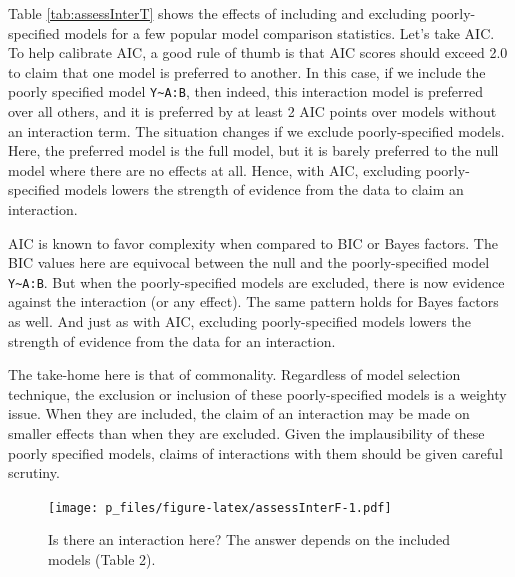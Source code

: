 \documentclass[
  english,
  ,man]{apa6}
\begin{document}
Table \ref{tab:assessInterT} shows the effects of including and excluding poorly-specified models for a few popular model comparison statistics. Let's take AIC. To help calibrate AIC, a good rule of thumb is that AIC scores should exceed 2.0 to claim that one model is preferred to another. In this case, if we include the poorly specified model \texttt{Y\textasciitilde{}A:B}, then indeed, this interaction model is preferred over all others, and it is preferred by at least 2 AIC points over models without an interaction term. The situation changes if we exclude poorly-specified models. Here, the preferred model is the full model, but it is barely preferred to the null model where there are no effects at all. Hence, with AIC, excluding poorly-specified models lowers the strength of evidence from the data to claim an interaction.

AIC is known to favor complexity when compared to BIC or Bayes factors. The BIC values here are equivocal between the null and the poorly-specified model \texttt{Y\textasciitilde{}A:B}. But when the poorly-specified models are excluded, there is now evidence against the interaction (or any effect). The same pattern holds for Bayes factors as well. And just as with AIC, excluding poorly-specified models lowers the strength of evidence from the data for an interaction.

The take-home here is that of commonality. Regardless of model selection technique, the exclusion or inclusion of these poorly-specified models is a weighty issue. When they are included, the claim of an interaction may be made on smaller effects than when they are excluded. Given the implausibility of these poorly specified models, claims of interactions with them should be given careful scrutiny.

\begin{figure}
\centering
\texttt{[image: p\_files/figure-latex/assessInterF-1.pdf]}
\caption{\label{fig:assessInterF}Is there an interaction here? The answer depends on the included models (Table 2).}
\end{figure}
\end{document}
